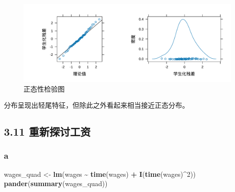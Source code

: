 \documentclass[
]{article}
\newenvironment{Shaded}{\begin{snugshade}}{\end{snugshade}}
\newcommand{\DecValTok}[1]{\textcolor[rgb]{0.00,0.00,0.81}{#1}}
\newcommand{\FunctionTok}[1]{\textcolor[rgb]{0.13,0.29,0.53}{\textbf{#1}}}
\newcommand{\NormalTok}[1]{#1}
\newcommand{\OtherTok}[1]{\textcolor[rgb]{0.56,0.35,0.01}{#1}}
\newcommand{\SpecialCharTok}[1]{\textcolor[rgb]{0.81,0.36,0.00}{\textbf{#1}}}
\begin{document}
\begin{figure}
\centering
\includegraphics{chapter3_files/figure-latex/normality-test1-1.pdf}
\caption{\label{fig:normality-test1}正态性检验图}
\end{figure}

分布呈现出轻尾特征，但除此之外看起来相当接近正态分布。

\hypertarget{ux91cdux65b0ux63a2ux8ba8ux5de5ux8d44}{%
\subsection{3.11 重新探讨工资}\label{ux91cdux65b0ux63a2ux8ba8ux5de5ux8d44}}

\hypertarget{a-5}{%
\subsubsection*{a}\label{a-5}}

\begin{Shaded}
\begin{Highlighting}[]
\NormalTok{wages\_quad }\OtherTok{\textless{}{-}} \FunctionTok{lm}\NormalTok{(wages }\SpecialCharTok{\textasciitilde{}} \FunctionTok{time}\NormalTok{(wages) }\SpecialCharTok{+} \FunctionTok{I}\NormalTok{(}\FunctionTok{time}\NormalTok{(wages)}\SpecialCharTok{\^{}}\DecValTok{2}\NormalTok{))}
\FunctionTok{pander}\NormalTok{(}\FunctionTok{summary}\NormalTok{(wages\_quad))}
\end{Highlighting}
\end{Shaded}
\end{document}
